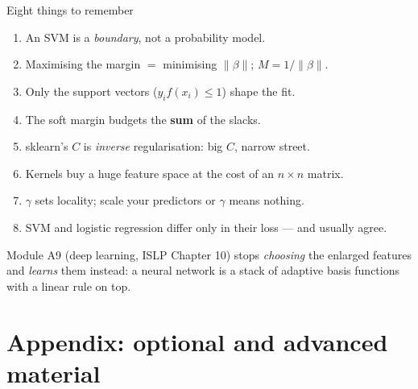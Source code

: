 \documentclass[aspectratio=169,11pt]{beamer}
\begin{document}
\begin{frame}{Eight things to remember}
  \footnotesize
  \begin{takeaway}
    \begin{enumerate}
      \item An SVM is a \emph{boundary}, not a probability model.
      \item Maximising the margin $=$ minimising $\|\beta\|$; $M=1/\|\beta\|$.
      \item Only the support vectors ($y_if(x_i)\le1$) shape the fit.
      \item The soft margin budgets the \textbf{sum} of the slacks.
      \item sklearn's $C$ is \emph{inverse} regularisation: big $C$, narrow
            street.
      \item Kernels buy a huge feature space at the cost of an $n\times n$
            matrix.
      \item $\gamma$ sets locality; scale your predictors or $\gamma$ means
            nothing.
      \item SVM and logistic regression differ only in their loss --- and
            usually agree.
    \end{enumerate}
  \end{takeaway}
  \begin{takeaway}
    Module A9 (deep learning, ISLP Chapter 10) stops \emph{choosing} the enlarged
    features and \emph{learns} them instead: a neural network is a stack of adaptive
    basis functions with a linear rule on top.
  \end{takeaway}
\end{frame}

\appendix
\AtBeginSection[]{}
\section{Appendix: optional and advanced material}
\end{document}
